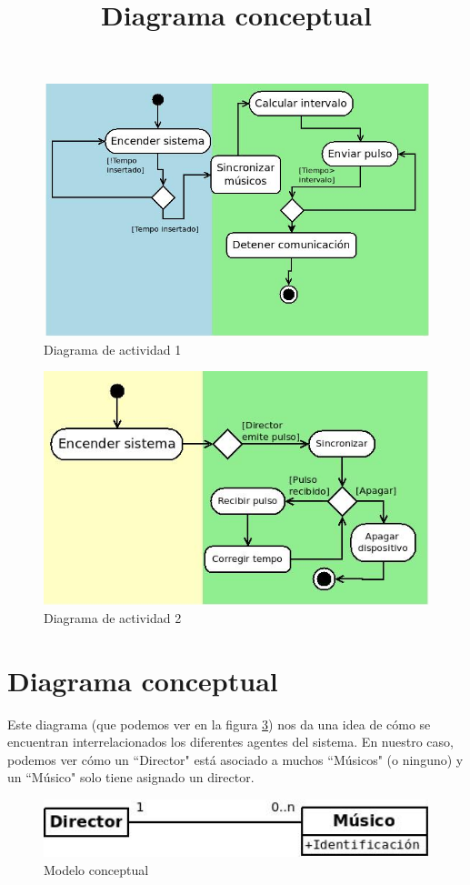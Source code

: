 \begin{figure}[!htb]
\centering
\includegraphics[width=1\textwidth]{./imagenes/diagramaactividad1}
\caption{Diagrama de actividad 1} \label{fig:diagramaactividad1}
\end{figure}

\begin{figure}[!htb]
\centering
\includegraphics[width=1\textwidth]{./imagenes/diagramaactividad2}
\caption{Diagrama de actividad 2} \label{fig:diagramaactividad2}
\end{figure}

\section{Diagrama conceptual}
\title{Diagrama conceptual}
Este diagrama (que podemos ver en la figura \ref{fig:modeloconceptual})
nos da una idea de cómo se encuentran interrelacionados los diferentes
agentes del sistema. En nuestro caso, podemos ver cómo un ``Director" está asociado
a muchos ``Músicos" (o ninguno) y un ``Músico" solo tiene asignado un director.\\


\begin{figure}[!htb]
\centering
\includegraphics[width=1\textwidth]{./imagenes/modeloconceptual}
\caption{Modelo conceptual} \label{fig:modeloconceptual}
\end{figure}
